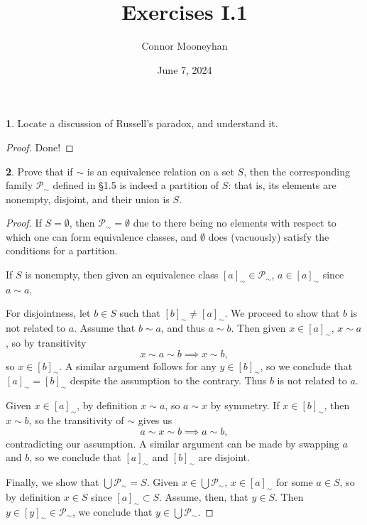 \documentclass{article}
\title{Exercises I.1}
\author{Connor Mooneyhan}
\date{June 7, 2024}
\newcounter{section-number}
\theoremstyle{definition}
\newtheorem{ex}{}[section-number]
\begin{document}
\maketitle

\begin{ex}
	Locate a discussion of Russell's paradox, and understand it.
\end{ex}
\begin{proof}
	Done!
\end{proof}

\begin{ex}
	Prove that if $\sim$ is an equivalence relation on a set $S$, then the corresponding family $\mathscr{P}_\sim$ defined in \S1.5 is indeed a partition of $S$: that is, its elements are nonempty, disjoint, and their union is $S$.
\end{ex}
\begin{proof}
	If $S = \emptyset$, then $\mathscr{P}_\sim = \emptyset$ due to there being no elements with respect to which one can form equivalence classes, and $\emptyset$ does (vacuously) satisfy the conditions for a partition.

	If $S$ is nonempty, then given an equivalence class $[a]_\sim \in \mathscr{P}_\sim$, $a \in [a]_\sim$ since $a \sim a$.

	For disjointness, let $b \in S$ such that $[b]_\sim \neq [a]_\sim$.
	We proceed to show that $b$ is not related to $a$.
	Assume that $b \sim a$, and thus $a \sim b$.
	Then given $x \in [a]_\sim$, $x \sim a$, so by transitivity \begin{equation*}
		x \sim a \sim b \implies x \sim b,
	\end{equation*}
	so $x \in [b]_\sim$.
	A similar argument follows for any $y \in [b]_\sim$, so we conclude that $[a]_\sim = [b]_\sim$ despite the assumption to the contrary.
	Thus $b$ is not related to $a$.

	Given $x \in [a]_\sim$, by definition $x \sim a$, so $a \sim x$ by symmetry.
	If $x \in [b]_\sim$, then $x \sim b$, so the transitivity of $\sim$ gives us \begin{equation*}
		a \sim x \sim b \implies a \sim b,
	\end{equation*}
	contradicting our assumption.
	A similar argument can be made by swapping $a$ and $b$, so we conclude that $[a]_\sim$ and $[b]_\sim$ are disjoint.

	Finally, we show that $\bigcup \mathscr{P}_\sim = S$.
	Given $x \in \bigcup \mathscr{P}_\sim$, $x \in [a]_\sim$ for some $a \in S$, so by definition $x \in S$ since $[a]_\sim \subset S$.
	Assume, then, that $y \in S$.
	Then $y \in [y]_\sim \in \mathscr{P}_\sim$, we conclude that $y \in \bigcup \mathscr{P}_\sim$.
\end{proof}
\end{document}
